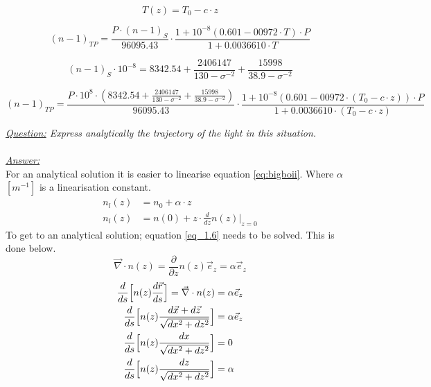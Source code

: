 \documentclass{article}
\begin{document}
\begin{equation}
	T(z) = T_0 - c \cdot z
	\label{eq:temp}
\end{equation}

\begin{equation}
	(n-1)_{TP} = \frac{P\cdot(n-1)_S}{96095.43}\cdot \frac{1+10^{-8}(0.601-00972\cdot T)\cdot P}{1+0.0036610\cdot T}
	\label{eq:edlen}
\end{equation}

\begin{equation}
	(n-1)_S \cdot 10^{-8} = 8342.54 + \frac{2406147}{130-\sigma^{-2}}+\frac{15998}{38.9-\sigma^{-2}}
	\label{eq:edlenS}
\end{equation}

\begin{equation}
	(n-1)_{TP} = \frac{P\cdot 10^8 \cdot (8342.54 + \frac{2406147}{130-\sigma^{-2}}+\frac{15998}{38.9-\sigma^{-2}})}{96095.43}\cdot \frac{1+10^{-8}(0.601-00972\cdot (T_0 - c \cdot z))\cdot P}{1+0.0036610\cdot (T_0 - c \cdot z)}
	\label{eq:bigboii}
\end{equation}


\textit{\underline{Question:} Express analytically the trajectory of the light in this situation.}\\
\\
\textit{\underline{Answer:}} \\
For an analytical solution it is easier to linearise equation \ref{eq:bigboii}. Where $\alpha$ $[m^{-1}]$ is a linearisation constant.
\begin{align*}
	n_l(z) &= n_0 + \alpha \cdot z\\
	n_l(z) &= n(0) +z \cdot \frac{d}{dz}n(z)\rvert_{z=0}
\end{align*}
To get to an analytical solution; equation \ref{eq_1.6} needs to be solved. This is done below.
\begin{equation*}
	\vec{\nabla} \cdot n(z) = \frac{\partial}{\partial z}n(z) \vec{e}_z = \alpha \vec{e}_z
\end{equation*}
\begin{align*}
	\frac{d}{ds} \Bigl[n(z)\frac{d\vec{r}}{ds}\Bigr] = \vec{\nabla}\cdot n(z) &= \alpha \vec{e}_z\\
	\frac{d}{ds} \Bigl[n(z)\frac{d\vec{x}+d\vec{z}}{\sqrt{dx^2 + dz^2}}\Bigr] &= \alpha \vec{e}_z\\
	\frac{d}{ds} \Bigl[n(z)\frac{dx}{\sqrt{dx^2 + dz^2}}\Bigr] &= 0\\
	\frac{d}{ds} \Bigl[n(z)\frac{dz}{\sqrt{dx^2 + dz^2}}\Bigr] &= \alpha\\
\end{align*}
\end{document}
